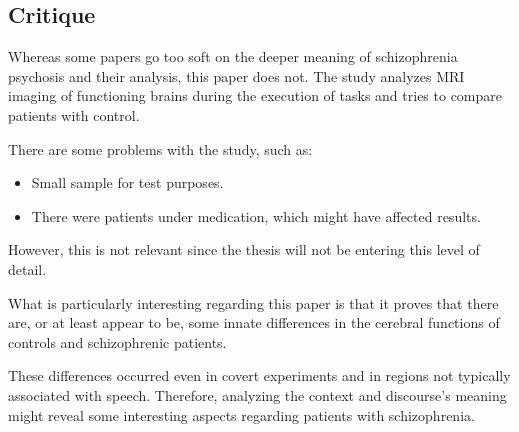 \documentclass{Paper_Summary}
\begin{document}
\makepapertitle

\breakline

\begin{center}
    \section*{Critique}
\end{center}
    
    Whereas some papers go too soft on the deeper meaning of schizophrenia psychosis and their analysis, this paper does not.
    The study analyzes MRI imaging of functioning brains during the execution of tasks and tries to compare patients with control.

    There are some problems with the study, such as:
    \begin{itemize}
        \item Small sample for test purposes. 
        \item There were patients under medication, which might have affected results. 
    \end{itemize}
    However, this is not relevant since the thesis will not be entering this level of detail.

    What is particularly interesting regarding this paper is that it proves that there are, or at least appear to be, some innate differences in the cerebral functions of controls and schizophrenic patients.
    
    These differences occurred even in covert experiments and in regions not typically associated with speech. Therefore, analyzing the context and discourse's meaning might reveal some interesting aspects regarding patients with schizophrenia.

\breakline
\end{document}

